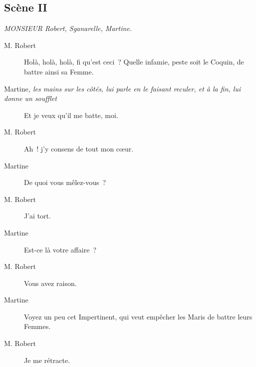 \documentclass[french,twoside]{book} %
\begin{document}
\subsection[{Scène II}]{Scène II}
\label{I02}
\textit{MONSIEUR Robert, Sganarelle, Martine.}\par
 \begin{description} \item[M. Robert] 

Holà, holà, holà, fi qu’est ceci ? Quelle infamie, peste soit le Coquin, de battre ainsi sa Femme.\end{description}
 \begin{description} \item[Martine\textit{, les mains sur les côtés, lui parle en le faisant reculer, et à la fin, lui donne un soufflet}\par
] 

Et je veux qu’il me batte, moi.\end{description}
 \begin{description} \item[M. Robert] 

Ah ! j’y consens de tout mon cœur.\end{description}
 \begin{description} \item[Martine] 

De quoi vous mêlez-vous ?\end{description}
 \begin{description} \item[M. Robert] 

J’ai tort.\end{description}
 \begin{description} \item[Martine] 

Est-ce là votre affaire ?\end{description}
 \begin{description} \item[M. Robert] 

Vous avez raison.\end{description}
 \begin{description} \item[Martine] 

Voyez un peu cet Impertinent, qui veut empêcher les Maris de battre leurs Femmes.\end{description}
 \begin{description} \item[M. Robert] 

Je me rétracte.\end{description}
\end{document}
